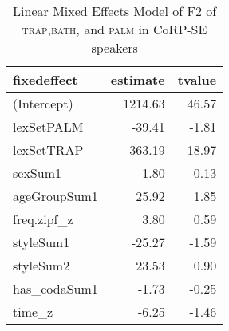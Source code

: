 \begin{table}[ht]
\centering
\begin{tabular}{lrr}
  \hline
fixedeffect & estimate & tvalue \\ 
  \hline
(Intercept) & 1214.63 & 46.57 \\ 
  lexSetPALM & -39.41 & -1.81 \\ 
  lexSetTRAP & 363.19 & 18.97 \\ 
  sexSum1 & 1.80 & 0.13 \\ 
  ageGroupSum1 & 25.92 & 1.85 \\ 
  freq.zipf\_z & 3.80 & 0.59 \\ 
  styleSum1 & -25.27 & -1.59 \\ 
  styleSum2 & 23.53 & 0.90 \\ 
  has\_codaSum1 & -1.73 & -0.25 \\ 
  time\_z & -6.25 & -1.46 \\ 
   \hline
\end{tabular}
\caption{Linear Mixed Effects Model of F2 of \textsc{trap},\textsc{bath}, and \textsc{palm} in CoRP-SE speakers \label{tbl:TBPF2SE}} 
\end{table}
